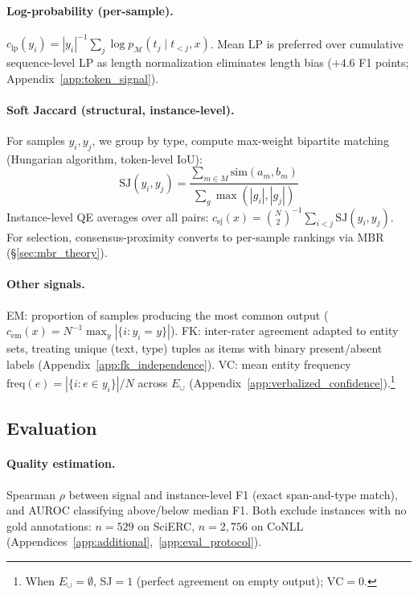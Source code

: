 \paragraph{Log-probability (per-sample).}
$c_{\text{lp}}(y_i) = |y_i|^{-1} \sum_{j} \log p_{\mathcal{M}}(t_j \mid t_{<j}, x)$.
Mean LP is preferred over cumulative sequence-level LP as length normalization eliminates length bias ($+4.6$ F1 points; Appendix~\ref{app:token_signal}).

\paragraph{Soft Jaccard (structural, instance-level).}
For samples $y_i, y_j$, we group by type, compute max-weight bipartite matching (Hungarian algorithm, token-level IoU):
\begin{equation}\label{eq:sj}
\text{SJ}(y_i, y_j) = \frac{\sum_{m \in M} \text{sim}(a_m, b_m)}{\sum_{g} \max(|g_i|, |g_j|)}
\end{equation}
Instance-level QE averages over all pairs: $c_{\text{sj}}(x) = \binom{N}{2}^{-1} \sum_{i<j} \text{SJ}(y_i, y_j)$.
For selection, consensus-proximity converts to per-sample rankings via MBR (\S\ref{sec:mbr_theory}).

\paragraph{Other signals.}
EM: proportion of samples producing the most common output ($c_{\text{em}}(x) = N^{-1} \max_{y} |\{i : y_i = y\}|$).
FK: inter-rater agreement \cite{fleiss1971agreement} adapted to entity sets, treating unique (text, type) tuples as items with binary present/absent labels (Appendix~\ref{app:fk_independence}).
VC: mean entity frequency $\text{freq}(e) = |\{i : e \in y_i\}| / N$ across $E_\cup$ (Appendix~\ref{app:verbalized_confidence}).\footnote{When $E_\cup = \emptyset$, SJ${=}1$ (perfect agreement on empty output); $\text{VC}{=}0$.}

\subsection{Evaluation}\label{sec:evaluation}

\paragraph{Quality estimation.}
Spearman $\rho$ between signal and instance-level F1 (exact span-and-type match), and AUROC classifying above/below median F1.
Both exclude instances with no gold annotations: $n{=}529$ on SciERC, $n{=}2{,}756$ on CoNLL (Appendices~\ref{app:additional},~\ref{app:eval_protocol}).

